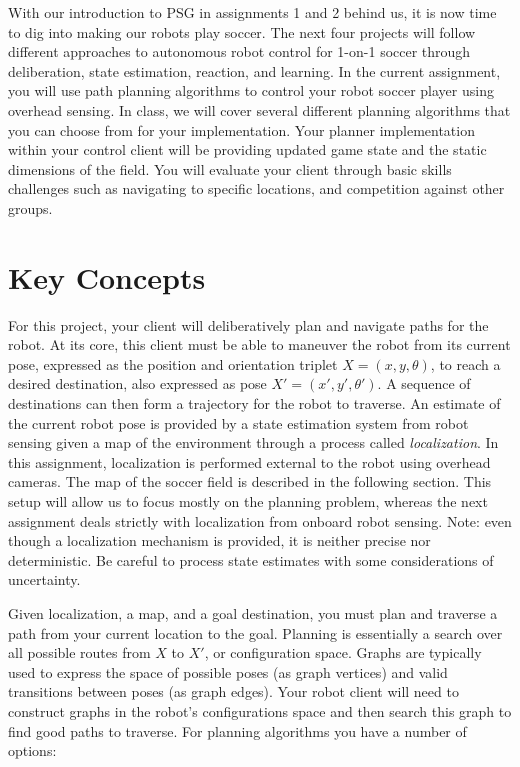 With our introduction to PSG in assignments 1 and 2 behind us, it is now time to dig into making our robots play soccer.  The next four projects will follow different approaches to autonomous robot control for 1-on-1 soccer through deliberation, state estimation, reaction, and learning.  In the current assignment, you will use path planning algorithms to control your robot soccer player using overhead sensing.  In class, we will cover several different planning algorithms that you can choose from for your implementation.  Your planner implementation within your control client will be providing updated game state and the static dimensions of the field.  You will evaluate your client through basic skills challenges such as navigating to specific locations, and competition against other groups.

\section{Key Concepts}

For this project, your client will deliberatively plan and navigate paths for the robot.  At its core, this client must be able to maneuver the robot from its current pose, expressed as the position and orientation triplet $X = (x,y,\theta)$, to reach a desired destination, also expressed as pose $X' = (x',y',\theta')$.  A sequence of destinations can then form a trajectory for the robot to traverse.   An estimate of the current robot pose is provided by a state estimation system from robot sensing given a map of the environment through a process called {\it localization}.  In this assignment, localization is performed external to the robot using overhead cameras.  The map of the soccer field is described in the following section.  This setup will allow us to focus mostly on the planning problem, whereas the next assignment deals strictly with localization from onboard robot sensing.  Note: even though a localization mechanism is provided, it is neither precise nor deterministic.  Be careful to process state estimates with some considerations of uncertainty.

Given localization, a map, and a goal destination, you must plan and traverse a path from your current location to the goal.  Planning is essentially a search over all possible routes from $X$ to $X'$, or configuration space.  Graphs are typically used to express the space of possible poses (as graph vertices) and valid transitions between poses (as graph edges).  Your robot client will need to construct graphs in the robot's configurations space and then search this graph to find good paths to traverse.  For planning algorithms you have a number of options:

